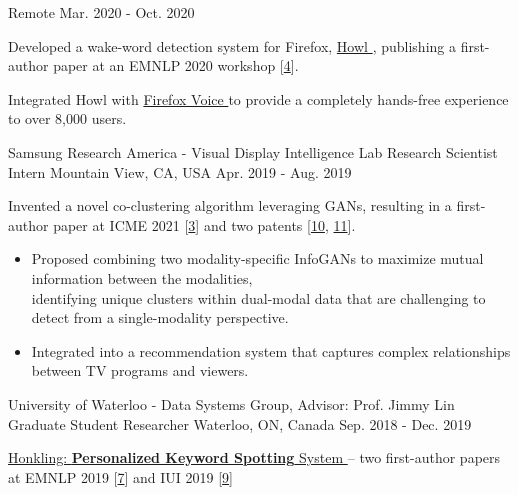 \begin{cventries}
{Remote} %
{Mar. 2020 - Oct. 2020} %
{ %
\begin{cvitems}
\item {Developed a wake-word detection system for Firefox, \href{https://github.com/castorini/howl}{Howl {\small \faGithub}}, publishing a first-author paper at an EMNLP 2020 workshop [\hyperlink{howl:EMNLP}{4}].}
\item {Integrated Howl with \href{https://github.com/mozilla-extensions/firefox-voice}{Firefox Voice {\small \faGithub}} to provide a completely hands-free experience to over 8,000 users.}
\end{cvitems}
}
\cventry
{Samsung Research America - Visual Display Intelligence Lab} %
{Research Scientist Intern} %
{Mountain View, CA, USA} %
{Apr. 2019 - Aug. 2019} %
{ %
\begin{cvitems}
\item {Invented a novel co-clustering algorithm leveraging GANs, resulting in a first-author paper at ICME 2021 [\hyperlink{CI-GAN:ICME}{3}] and two patents [\hyperlink{CI-GAN:International}{10}, \hyperlink{CI-GAN:US}{11}].}
\begin{itemize}[label=$\cdot$,leftmargin=0.7em]
\item {Proposed combining two modality-specific InfoGANs to maximize mutual information between the modalities, \\ identifying unique clusters within dual-modal data that are challenging to detect from a single-modality perspective.}
\item {Integrated into a recommendation system that captures complex relationships between TV programs and viewers.}
\end{itemize}
\end{cvitems}
}
\cventry
{University of Waterloo - Data Systems Group, Advisor: Prof. Jimmy Lin} %
{Graduate Student Researcher} %
{Waterloo, ON, Canada} %
{Sep. 2018 - Dec. 2019} %
{ %
\begin{cvitems}
\item {\href{https://github.com/castorini/honkling}{Honkling: \textbf{Personalized Keyword Spotting} System {\small \faGithub}} -- two first-author papers at EMNLP 2019 [\hyperlink{honkling:EMNLP}{7}] and IUI 2019 [\hyperlink{honkling:IUI}{9}]}

\end{cvitems}}
\end{cventries}
